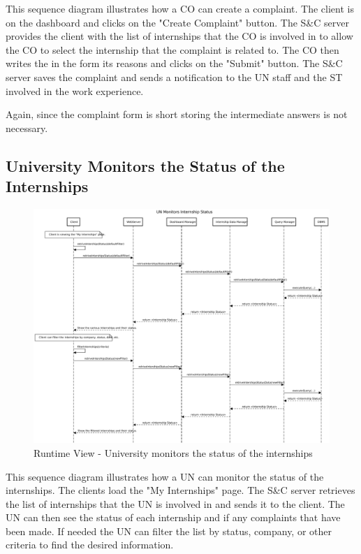\par This sequence diagram illustrates how a CO can create a complaint. The client is on the dashboard and clicks
on the "Create Complaint" button. The S\&C server provides the client with the list of internships that the CO is
involved in to allow the CO to select the internship that the complaint is related to. The CO then writes the in the
form its reasons and clicks on the "Submit" button. The S\&C server saves the complaint and sends a notification to
the UN staff and the ST involved in the work experience.

\par Again, since the complaint form is short storing the intermediate answers is not necessary.


\subsection{University Monitors the Status of the Internships}
\label{sub:university-monitors-the-status-of-the-internships}%

\begin{figure}[H]
      \centering
      \includegraphics[width=1.0\textwidth]{Images/RV_12.pdf}
      \caption{Runtime View - University monitors the status of the internships}
      \label{fig:rv-un-monitors-internships}
\end{figure}

\par This sequence diagram illustrates how a UN can monitor the status of the internships. The clients load the "My
Internships" page. The S\&C server retrieves the list of internships that the UN is involved in and sends it to the
client. The UN can then see the status of each internship and if any complaints that have been made. If needed the UN
can filter the list by status, company, or other criteria to find the desired information.

